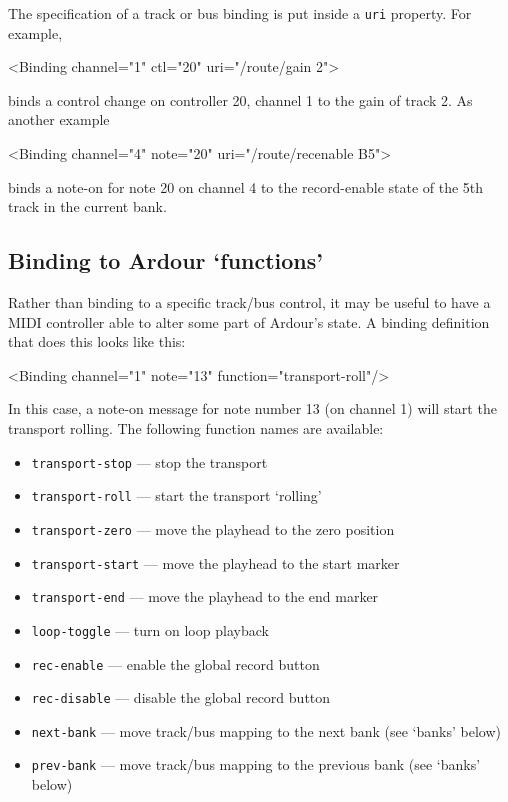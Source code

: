 \documentclass[10pt,a4paper]{book}
\begin{document}
The specification of a track or bus binding is put inside a \texttt{uri} property.  For example,

\begin{listing}
<Binding channel="1" ctl="20" uri="/route/gain 2">
\end{listing}

binds a control change on controller 20, channel 1 to the gain of track 2.  As another example

\begin{listing}
<Binding channel="4" note="20" uri="/route/recenable B5">
\end{listing}

binds a note-on for note 20 on channel 4 to the record-enable state of
the 5th track in the current bank.



\subsection{Binding to Ardour `functions'}

Rather than binding to a specific track/bus control, it may be useful
to have a MIDI controller able to alter some part of Ardour's state. A
binding definition that does this looks like this:

\begin{listing}
<Binding channel="1" note="13" function="transport-roll"/>
\end{listing}

In this case, a note-on message for note number 13 (on channel 1) will
start the transport rolling. The following function names are
available:

\begin{itemize}
\item \texttt{transport-stop} --- stop the transport 
\item \texttt{transport-roll} --- start the transport `rolling'
\item \texttt{transport-zero} --- move the playhead to the zero position 
\item \texttt{transport-start} --- move the playhead to the start marker 
\item \texttt{transport-end} --- move the playhead to the end marker 
\item \texttt{loop-toggle} --- turn on loop playback 
\item \texttt{rec-enable} --- enable the global record button 
\item \texttt{rec-disable} --- disable the global record button 
\item \texttt{next-bank} --- move track/bus mapping to the next bank (see `banks' below) 
\item \texttt{prev-bank} --- move track/bus mapping to the previous bank (see `banks' below) 
\end{itemize}
\end{document}
